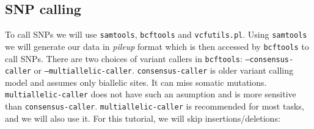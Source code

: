 \subsection{SNP calling}
To call SNPs we will use \texttt{samtools}, \texttt{bcftools} and \texttt{vcfutils.pl}.
Using \texttt{samtools} we will generate our data in \textit{pileup} format which
is then accessed by \texttt{bcftools} to call SNPs.
There are two choices of variant callers in \texttt{bcftools}:
\texttt{--consensus-caller} or \texttt{--multiallelic-caller}. \texttt{consensus-caller} is
older variant calling model and assumes only biallelic sites. It can miss somatic mutations.
\texttt{multiallelic-caller} does not have such an asumption and is more sensitive than \texttt{consensus-caller}.
\texttt{multiallelic-caller} is recommended for most tasks, and we will also use it. For this tutorial, we will skip insertions/deletions: \\~\\
